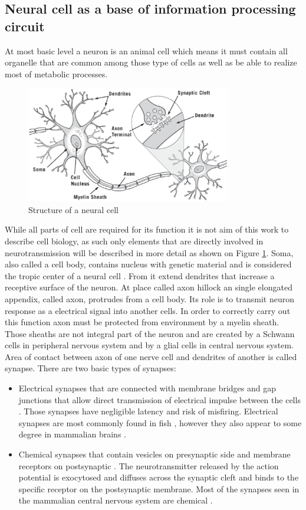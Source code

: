 \subsection{Neural cell as a base of information processing circuit}
\FloatBarrier
At most basic level a neuron is an animal cell which means it must contain all organelle that
are common among those type of cells as well as be able to realize most of metabolic processes.
\begin{figure}[htb] 
	\centering
	\includegraphics[width=0.8\textwidth]{figures/neural_cell}
	\caption{Structure of a neural cell \cite{Cook2014}}
	\label{fig:neural_cell}
\end{figure}
While all parts of cell are required for its function it is not aim of this work to describe 
cell biology, as such only elements that are directly involved in neurotransmission will be
described in more detail as shown on Figure \ref{fig:neural_cell}.
Soma, also called a cell body, contains nucleus with genetic material and is considered the 
tropic center of a neural cell \cite{Jacobson2017}. From it extend dendrites that increase a 
receptive surface of  the neuron.
At place called axon hillock an single elongated appendix, called axon, protrudes
from a cell body. Its role is to transmit neuron response as a electrical signal into another
cells. In order to correctly carry out this function axon must be protected from environment 
by a myelin sheath. Those sheaths are not integral part of the neuron and are created by a
Schwann cells in peripheral nervous system and by a glial cells in central nervous system.
Area of contact between axon of one nerve cell and dendrites of another is called synapse.
There are two basic types of synapses:
\begin{itemize}
	\item Electrical synapses that are connected with membrane bridges and gap junctions
	that allow direct transmission of electrical impulse between the cells \cite{Connors2017}.
	Those synapses have negligible latency and risk of misfiring.
	Electrical synapses are most commonly found in fish \cite{Yao2014}, however they also appear
	to some degree in mammalian brains \cite{Connors2004}.
	\item Chemical synapses that contain vesicles on presynaptic side and membrane receptors on 
	postsynaptic \cite{Fuster2015}.
	The neurotransmitter released by the action potential is exocytosed and diffuses
	across the synaptic cleft and binds to the specific receptor on the postsynaptic membrane.
	Most of the synapses seen in the mammalian central nervous system are chemical \cite{Boto2019}.
\end{itemize}
